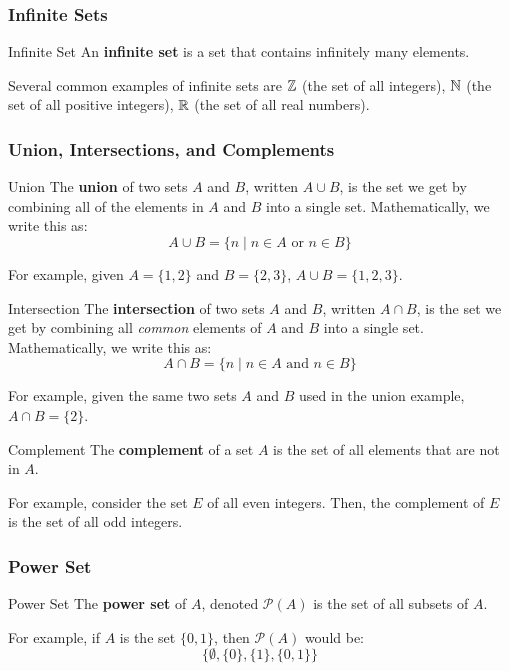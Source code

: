 \documentclass[letterpaper]{article}
\begin{document}
\subsubsection{Infinite Sets}

\begin{definition}{Infinite Set}{}
    An \textbf{infinite set} is a set that contains infinitely many elements.
\end{definition}
Several common examples of infinite sets are $\mathbb{Z}$ (the set of all integers), $\mathbb{N}$ (the set of all positive integers), $\mathbb{R}$ (the set of all real numbers). 

\subsubsection{Union, Intersections, and Complements}

\begin{definition}{Union}{}
    The \textbf{union} of two sets $A$ and $B$, written $A \cup B$, is the set we get by combining all of the elements in $A$ and $B$ into a single set. Mathematically, we write this as: 
    \[A \cup B = \{n \mid n \in A \text{ or } n \in B\}\]
\end{definition}
For example, given $A = \{1, 2\}$ and $B = \{2, 3\}$, $A \cup B = \{1, 2, 3\}$. 

\begin{definition}{Intersection}{}
    The \textbf{intersection} of two sets $A$ and $B$, written $A \cap B$, is the set we get by combining all \emph{common} elements of $A$ and $B$ into a single set. Mathematically, we write this as: 
    \[A \cap B = \{n \mid n \in A \text{ and } n \in B\}\]
\end{definition}
For example, given the same two sets $A$ and $B$ used in the union example, $A \cap B = \{2\}$. 

\begin{definition}{Complement}{}
    The \textbf{complement} of a set $A$ is the set of all elements that are not in $A$.
\end{definition}
For example, consider the set $E$ of all even integers. Then, the complement of $E$ is the set of all odd integers.

\subsubsection{Power Set}
\begin{definition}{Power Set}{}
    The \textbf{power set} of $A$, denoted $\mathcal{P}(A)$ is the set of all subsets of $A$.
\end{definition}
For example, if $A$ is the set $\{0, 1\}$, then $\mathcal{P}(A)$ would be: 
\[\{\emptyset, \{0\}, \{1\}, \{0, 1\}\}\] 
\end{document}
